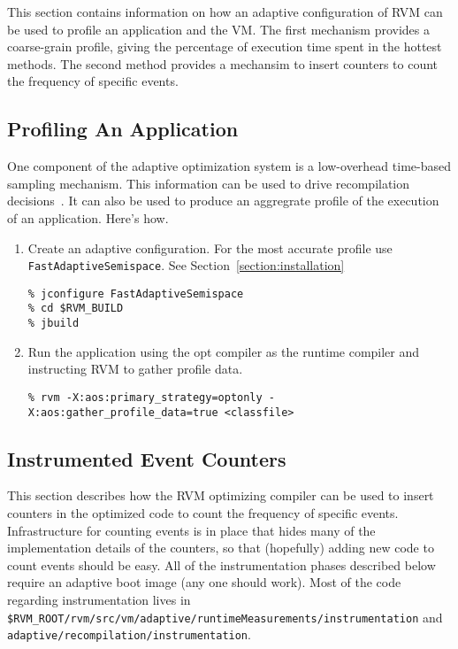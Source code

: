 This section contains information on how an adaptive configuration of
RVM can be used to profile an application and the VM.  The first
mechanism provides a coarse-grain profile, giving the percentage of
execution time spent in the hottest methods.  The second method
provides a mechansim to insert counters to count the frequency of 
specific events. 

\subsection{Profiling An Application}
One component of the adaptive optimization system is a low-overhead
time-based sampling mechanism.  This information can be used to drive
recompilation decisions\T~\cite{jalapeno-adaptive-00}.
It can also be used to produce an aggregrate
profile of the execution of an application.  
Here's how.

\begin{enumerate}
\item Create an adaptive configuration.  For the most accurate profile use
{\tt FastAdaptiveSemispace}.  See Section~\ref{section:installation}
\begin{verbatim}
% jconfigure FastAdaptiveSemispace
% cd $RVM_BUILD
% jbuild
\end{verbatim}

\item Run the application using the opt compiler as the runtime compiler and
instructing RVM to gather profile data.
\begin{verbatim}
% rvm -X:aos:primary_strategy=optonly -X:aos:gather_profile_data=true <classfile>
\end{verbatim}
\end{enumerate}

\subsection{Instrumented Event Counters}
\label{counting_events}
This section describes how the RVM optimizing compiler can be used to
insert counters in the optimized code to count the frequency of
specific events.  Infrastructure for counting events is in place that
hides many of the implementation details of the counters, so that
(hopefully) adding new code to count events should be easy.  All of
the instrumentation phases described below require an adaptive boot
image (any one should work).  Most of the code regarding
instrumentation lives in {\tt
\$RVM\_ROOT/rvm/src/vm/adaptive/runtimeMeasurements/instrumentation} and {\tt
adaptive/recompilation/instrumentation}.

